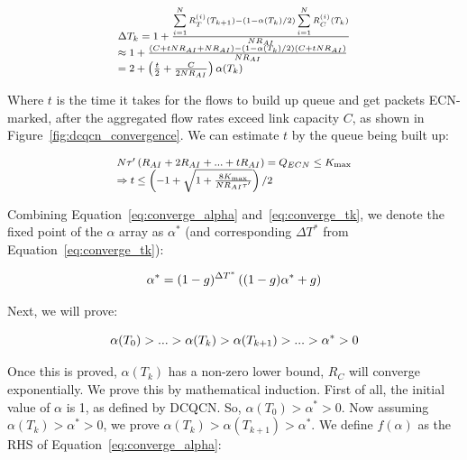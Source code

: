 \begin{equation}
\small
\begin{array}{l}
\Delta {T_k} = 1 + \frac{{\sum\limits_{i = 1}^N {R_T^{(i)}({T_{k + 1}})}  - \left( {1 - \alpha ({T_k})/2} \right)\sum\limits_{i = 1}^N {R_C^{(i)}({T_k})} }}{{N{R_{AI}}}}\\
 \approx 1 + \frac{{\left( {C + tN{R_{AI}} + N{R_{AI}}} \right) - \left( {1 - \alpha ({T_k})/2} \right)\left( {C + tN{R_{AI}}} \right)}}{{N{R_{AI}}}}\\
 = 2 + \left( {\frac{t}{2} + \frac{C}{{2N{R_{AI}}}}} \right)\alpha ({T_k})
\end{array}
\label{eq:converge_tk}
\end{equation}

Where $t$ is the time it takes for the flows to build up queue and get packets ECN-marked, after
the aggregated flow rates exceed link capacity $C$, as shown in Figure~\ref{fig:dcqcn_convergence}.
We can estimate $t$ by the queue being built up:

\begin{equation}
\small
\begin{array}{l}
N\tau '\left( {{R_{AI}} + 2{R_{AI}} + ... + t{R_{AI}}} \right) = {Q_{ECN}} \le {K_{\max }}\\
 \Rightarrow t \le \left( { - 1 + \sqrt {1 + \frac{{8{K_{\max }}}}{{N{R_{AI}}\tau '}}} } \right)/2
\end{array}
\end{equation}

Combining Equation~\ref{eq:converge_alpha} and~\ref{eq:converge_tk}, we denote the fixed point of 
the $\alpha$ array as $\alpha^{*}$ (and corresponding $\Delta T^{*}$ from Equation~\ref{eq:converge_tk}):

\begin{equation}
\small
{\alpha ^*} = {(1 - g)^{\Delta {T^*}}}\left( {(1 - g){\alpha ^*} + g} \right)
\end{equation}

Next, we will prove:

\begin{equation}
\small
\alpha ({T_0}) > ... > \alpha ({T_k}) > \alpha ({T_{k + 1}}) > ... > {\alpha ^*} > 0
\end{equation}

Once this is proved, $\alpha ({T_k})$ has a non-zero lower bound, $R_C$ will converge exponentially.
We prove this by mathematical induction. First of all, the initial value of $\alpha$ is 1, as defined
by DCQCN. So, $\alpha ({T_0}) > {\alpha ^*} > 0$. Now assuming $\alpha ({T_k}) > {\alpha ^*} > 0$, we 
prove $\alpha ({T_k}) > \alpha ({T_{k+1}}) > {\alpha ^*}$. We define $f(\alpha)$ as the RHS of 
Equation~\ref{eq:converge_alpha}:

